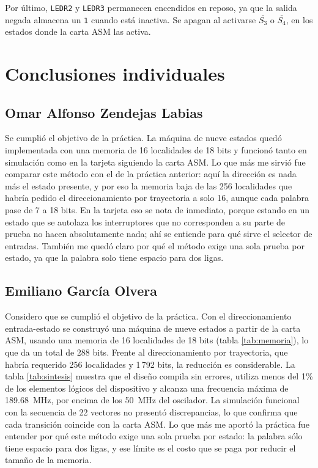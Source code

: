 Por último, \texttt{LEDR2} y \texttt{LEDR3} permanecen encendidos en reposo, ya que la salida
negada almacena un \texttt{1} cuando está inactiva. Se apagan al activarse $\overline{S_3}$ o
$\overline{S_4}$, en los estados donde la carta ASM las activa.

\section{Conclusiones individuales}

\subsection{Omar Alfonso Zendejas Labias}

Se cumplió el objetivo de la práctica. La máquina de nueve estados quedó implementada con
una memoria de 16 localidades de 18 bits y funcionó tanto en simulación como en la tarjeta
siguiendo la carta ASM. Lo que más me sirvió fue comparar este método con el de la práctica
anterior: aquí la dirección es nada más el estado presente, y por eso la memoria baja de
las 256 localidades que habría pedido el direccionamiento por trayectoria a solo 16, aunque
cada palabra pase de 7 a 18 bits. En la tarjeta eso se nota de inmediato, porque estando en
un estado que se autolaza los interruptores que no corresponden a su parte de prueba no
hacen absolutamente nada; ahí se entiende para qué sirve el selector de entradas. También
me quedó claro por qué el método exige una sola prueba por estado, ya que la palabra solo
tiene espacio para dos ligas.

\subsection{Emiliano García Olvera}

Considero que se cumplió el objetivo de la práctica. Con el direccionamiento entrada-estado
se construyó una máquina de nueve estados a partir de la carta ASM, usando una memoria de
16 localidades de 18 bits (tabla \ref{tab:memoria}), lo que da un total de 288 bits. Frente
al direccionamiento por trayectoria, que habría requerido 256 localidades y 1\,792 bits, la
reducción es considerable. La tabla \ref{tab:sintesis} muestra que el diseño compila sin
errores, utiliza menos del 1\% de los elementos lógicos del dispositivo y alcanza una
frecuencia máxima de 189.68~MHz, por encima de los 50~MHz del oscilador. La simulación
funcional con la secuencia de 22 vectores no presentó discrepancias, lo que confirma que
cada transición coincide con la carta ASM. Lo que más me aportó la práctica fue entender por
qué este método exige una sola prueba por estado: la palabra sólo tiene espacio para dos
ligas, y ese límite es el costo que se paga por reducir el tamaño de la memoria.

